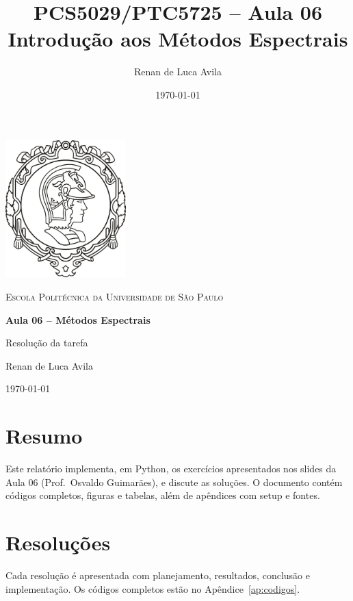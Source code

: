 \documentclass[12pt,a4paper]{article}
\title{PCS5029/PTC5725 -- Aula 06\\\large Introdução aos Métodos Espectrais}
\author{Renan de Luca Avila}
\date{\today}
\begin{document}
\begin{titlepage}
\centering
\includegraphics[width=0.35\textwidth]{EP.jpg}\par\vspace{1cm}
{\scshape\LARGE Escola Politécnica da Universidade de São Paulo\par}
\vspace{1.5cm}
{\huge\bfseries Aula 06 -- Métodos Espectrais\par}
\vspace{0.5cm}
{\Large Resolução da tarefa\par}
\vfill
{\large Renan de Luca Avila\par}
{\large \today\par}
\end{titlepage}

\tableofcontents
\newpage

\section{Resumo}
Este relatório implementa, em Python, os exercícios apresentados nos slides da Aula 06 (Prof.\ Osvaldo Guimarães), e discute as soluções. O documento contém códigos completos, figuras e tabelas, além de apêndices com setup e fontes.

\section{Resoluções}
Cada resolução é apresentada com planejamento, resultados, conclusão e implementação. Os códigos completos estão no Apêndice~\ref{ap:codigos}.


\end{document}

